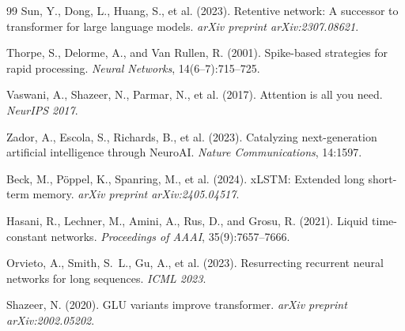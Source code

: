\documentclass[11pt,a4paper]{article}
\begin{document}
\begin{thebibliography}{99}
Sun, Y., Dong, L., Huang, S., et al. (2023).
Retentive network: A successor to transformer for large language models.
\textit{arXiv preprint arXiv:2307.08621}.

Thorpe, S., Delorme, A., and Van Rullen, R. (2001).
Spike-based strategies for rapid processing.
\textit{Neural Networks}, 14(6--7):715--725.

Vaswani, A., Shazeer, N., Parmar, N., et al. (2017).
Attention is all you need.
\textit{NeurIPS 2017}.

Zador, A., Escola, S., Richards, B., et al. (2023).
Catalyzing next-generation artificial intelligence through NeuroAI.
\textit{Nature Communications}, 14:1597.

Beck, M., P\"{o}ppel, K., Spanring, M., et al. (2024).
xLSTM: Extended long short-term memory.
\textit{arXiv preprint arXiv:2405.04517}.

Hasani, R., Lechner, M., Amini, A., Rus, D., and Grosu, R. (2021).
Liquid time-constant networks.
\textit{Proceedings of AAAI}, 35(9):7657--7666.

Orvieto, A., Smith, S.~L., Gu, A., et al. (2023).
Resurrecting recurrent neural networks for long sequences.
\textit{ICML 2023}.

Shazeer, N. (2020).
GLU variants improve transformer.
\textit{arXiv preprint arXiv:2002.05202}.

\end{thebibliography}
\end{document}
